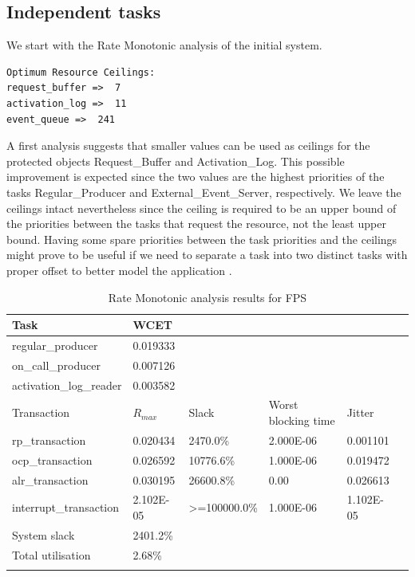 \documentclass{article}
\begin{document}
\subsection{Independent tasks} \label{independent-tasks}

We start with the Rate Monotonic analysis of the initial system.

\begin{lstlisting}
Optimum Resource Ceilings:
request_buffer =>  7
activation_log =>  11
event_queue =>  241
\end{lstlisting}

A first analysis suggests that smaller values can be used as ceilings for the protected objects Request\_Buffer and Activation\_Log. This possible improvement is expected since the two values are the highest priorities of the tasks Regular\_Producer and External\_Event\_Server, respectively. We leave the ceilings intact nevertheless since the ceiling is required to be an upper bound of the priorities between the tasks that request the resource, not the least upper bound. Having some spare priorities between the task priorities and the ceilings might prove to be useful if we need to separate a task into two distinct tasks with proper offset to better model the application \cite{tindell-offsets}.

\begin{longtable}{llllll}
   \toprule
   Task & WCET \\
   \midrule
   regular\_producer & 0.019333 \\
   on\_call\_producer & 0.007126 \\
   activation\_log\_reader & 0.003582 \\
   \toprule
   \toprule
   Transaction & $R_{max}$ & Slack & Worst blocking time & Jitter \\
   \midrule
   rp\_transaction & 0.020434  & 2470.0\% &  2.000E-06 & 0.001101 \\
   ocp\_transaction & 0.026592 & 10776.6\% & 1.000E-06 & 0.019472 \\
   alr\_transaction & 0.030195 & 26600.8\% & 0.00 & 0.026613 \\
   interrupt\_transaction & 2.102E-05 & >=100000.0\% & 1.000E-06 & 1.102E-05 \\
   \toprule
   \toprule
   System slack & 2401.2\% \\
   Total utilisation & 2.68\% \\
   \bottomrule
\caption{Rate Monotonic analysis results for FPS}
\label{tab:rm-fps}
\end{longtable}
\end{document}
